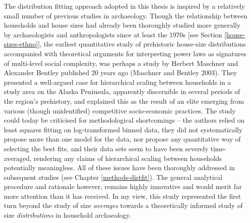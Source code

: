 \documentclass[
  12pt,
  a4paper, twoside]{book}
\begin{document}
The distribution fitting approach adopted in this thesis is inspired by a relatively small number of previous studies in archaeology. Though the relationship between households and house sizes had already been thoroughly studied more generally by archaeologists and anthropologists since at least the 1970s {[}see Section \ref{house-sizes-ethno}{]}, the earliest quantitative study of prehistoric house-size distributions accompanied with theoretical arguments for interpreting power laws as signatures of multi-level social complexity, was perhaps a study by Herbert Maschner and Alexander Bentley published 20 years ago (Maschner and Bentley 2003). They presented a well-argued case for hierarchical scaling between households in a study area on the Alaska Peninsula, apparently discernible in several periods of the region's prehistory, and explained this as the result of an elite emerging from various (though unidentified) competitive socio-economic practices. The study could today be criticised for methodological shortcomings -- the authors relied on least squares fitting on log-transformed binned data, they did not systematically propose more than one model for the data, nor propose any quantitative way of selecting the best fits, and their data sets seem to have been severely time-averaged, rendering any claims of hierarchical scaling between households potentially meaningless. All of these issues have been thoroughly addressed in subsequent studies (see Chapter \ref{methods-distfit}). The general analytical procedure and rationale however, remains highly innovative and would merit far more attention than it has received. In my view, this study represented the first turn beyond the study of size \emph{averages} towards a theoretically informed study of size \emph{distributions} in household archaeology.
\end{document}
